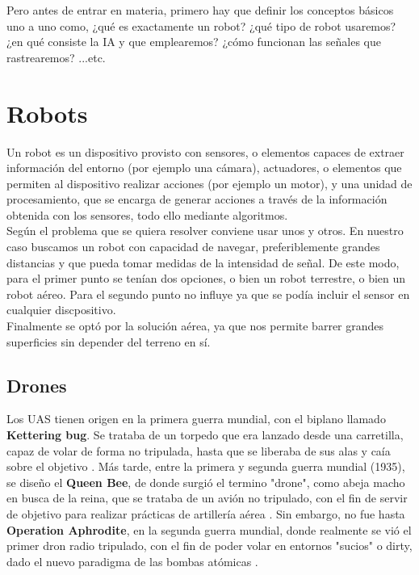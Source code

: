 Pero antes de entrar en materia, primero hay que definir los conceptos básicos uno a uno como, ¿qué es exactamente un robot? ¿qué tipo de robot usaremos? ¿en qué consiste la \ac{IA} y que emplearemos? ¿cómo funcionan las señales que rastrearemos? ...etc.

\section{Robots}
\label{sec:robots}

Un robot es un dispositivo provisto con sensores, o elementos capaces de extraer información del entorno (por ejemplo una cámara), actuadores, o elementos que permiten al dispositivo realizar acciones (por ejemplo un motor), y una unidad de procesamiento, que se encarga de generar acciones a través de la información obtenida con los sensores, todo ello mediante algoritmos.\\

Según el problema que se quiera resolver conviene usar unos y otros. En nuestro caso buscamos un robot con capacidad de navegar, preferiblemente grandes distancias y que pueda tomar medidas de la intensidad de señal. De este modo, para el primer punto se tenían dos opciones, o bien un robot terrestre, o bien un robot aéreo. Para el segundo punto no influye ya que se podía incluir el sensor en cualquier discpositivo.\\

Finalmente se optó por la solución aérea, ya que nos permite barrer grandes superficies sin depender del terreno en sí.

\subsection{Drones}
\label{subsec:drones}

Los \ac{UAS} tienen origen en la primera guerra mundial, con el biplano llamado \textbf{Kettering bug}. Se trataba de un torpedo que era lanzado desde una carretilla, capaz de volar de forma no tripulada, hasta que se liberaba de sus alas y caía sobre el objetivo \cite{kettering-bug}. Más tarde, entre la primera y segunda guerra mundial (1935), se diseño el \textbf{Queen Bee}, de donde surgió el termino "drone", como abeja macho en busca de la reina, que se trataba de un avión no tripulado, con el fin de servir de objetivo para realizar prácticas de artillería aérea \cite{queen-bee}. Sin embargo, no fue hasta \textbf{Operation Aphrodite}, en la segunda guerra mundial, donde realmente se vió el primer dron radio tripulado, con el fin de poder volar en entornos "sucios" o dirty, dado el nuevo paradigma de las bombas atómicas \cite{operation-aphrodite}.\\

